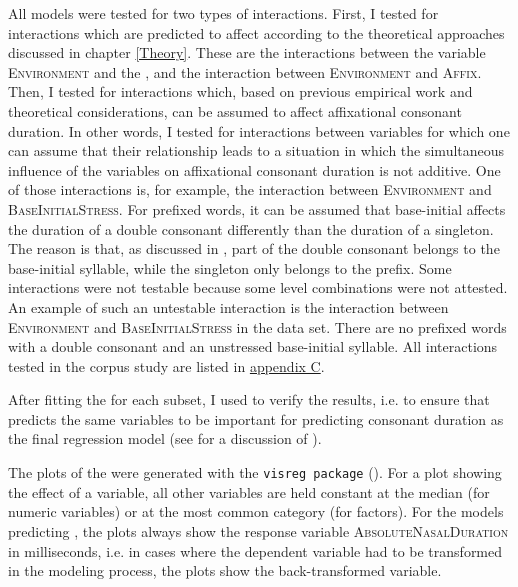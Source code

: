 All models were tested for two types of  interactions. First, I tested for interactions which are predicted to affect  according to the theoretical approaches discussed in chapter \ref{Theory}. These  are the interactions between the variable \textsc{Environment} and the , and the interaction between \textsc{Environment} and \textsc{Affix}.
Then, I tested for interactions which, based on previous empirical work and theoretical considerations, can be assumed to affect affixational consonant duration. In other words, I tested for interactions between variables for which one can assume that their relationship leads to a situation in which the simultaneous influence of the variables on affixational consonant duration is not additive. One of those interactions is, for example, the interaction between \textsc{Environment} and \textsc{BaseInitialStress}. For prefixed words, it can be assumed that base-initial  affects the duration of a double consonant differently than the duration of a singleton. The reason is that, as discussed in , part of the double consonant belongs to the base-initial syllable, while the singleton only belongs to the prefix. 
Some interactions were not testable because some level combinations were not attested. An example of such an untestable interaction is the interaction between \textsc{Environment} and \textsc{BaseInitialStress} in the data set. There are no prefixed words with a double consonant and an unstressed base-initial syllable. All interactions tested in the corpus study are listed in \hyperref[Appendix C: Summaries of tested interactions in corpus study]{appendix C}.

After fitting the  for each subset, I used  to verify the results, i.e. to ensure that  predicts the same variables to be important for predicting consonant duration as the final regression model (see  for a discussion of ).




The plots of the  were generated with the \texttt{visreg package} (\citealt{Breheny.2015}). For a plot showing the effect of a variable, all other variables are held constant at the median (for numeric variables) or at the most common category (for factors). For the models predicting , the plots always show the response variable \textsc{AbsoluteNasalDuration} in milliseconds, i.e. in cases where the dependent variable had to be transformed in the modeling process, the plots show the back-transformed variable.



